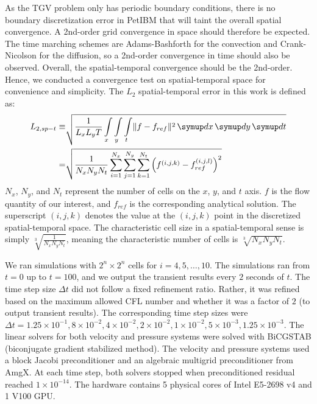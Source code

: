 As the TGV problem only has periodic boundary conditions, there is no boundary discretization error in PetIBM that will taint the overall spatial convergence.
A 2nd-order grid convergence in space should therefore be expected.
The time marching schemes are Adams-Bashforth for the convection and Crank-Nicolson for the diffusion, so a 2nd-order convergence in time should also be observed.
Overall, the spatial-temporal convergence should be the 2nd-order.
Hence, we conducted a convergence test on spatial-temporal space for  convenience and simplicity.
The $L_2$ spatial-temporal error in this work is defined as:
\begin{equation}\label{eq:spt-err-def}
    \begin{aligned}
    L_{2,sp-t} \equiv &\sqrt{
        \frac{1}{L_x L_y T}
        \int\limits_{x} \int\limits_{y} \int\limits_{t} \lVert f - f_{ref} \rVert^2 \diff x \diff y \diff t
    } \\
    = &
    \sqrt{\frac{1}{N_x N_y N_t}\sum\limits_{i=1}^{N_x}\sum\limits_{j=1}^{N_y}\sum\limits_{k=1}^{N_t}\left(f^{(i, j, k)} - f_{ref}^{(i, j, l)}\right)^2}
    \end{aligned}
\end{equation}
$N_x$, $N_y$, and $N_t$ represent the number of cells on the $x$, $y$, and $t$ axis.
$f$ is the flow quantity of our interest, and $f_{ref}$ is the corresponding analytical solution.
The superscript $(i, j, k)$ denotes the value at the $(i, j, k)$ point in the discretized spatial-temporal space.
The characteristic cell size in a spatial-temporal sense is simply $\sqrt[3]{\frac{1}{N_x N_y N_t}}$, meaning the characteristic number of cells is $\sqrt[3]{N_x N_y N_t}$.

We ran simulations with $2^{n} \times 2^{n}$ cells for $i=4, 5, \dots, 10$.
The simulations ran from $t=0$ up to $t=100$, and we output the transient results every $2$ seconds of $t$.
The time step size $\Delta t$ did not follow a fixed refinement ratio.
Rather, it was refined based on the maximum allowed CFL number and whether it was a factor of $2$ (to output transient results).
The corresponding time step sizes were $\Delta t = 1.25\times 10^{-1}, 8\times 10^{-2}, 4\times 10^{-2}, 2\times 10^{-2}, 1\times 10^{-2}, 5\times 10^{-3}, 1.25\times 10^{-3}$.
The linear solvers for both velocity and pressure systems were solved with BiCGSTAB (biconjugate gradient stabilized method).
The velocity and pressure systems used a block Jacobi preconditioner and an algebraic multigrid preconditioner from AmgX.
At each time step, both solvers stopped when preconditioned residual reached $1\times 10^{-14}$.
The hardware contains 5 physical cores of Intel E5-2698 v4 and 1 V100 GPU.

